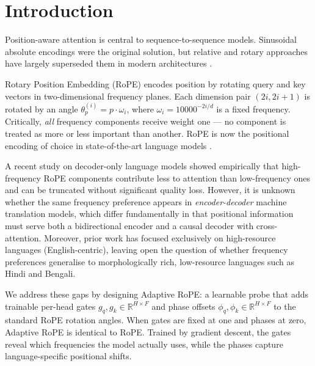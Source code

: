 \documentclass[conference]{IEEEtran}
\begin{document}
\section{Introduction}

Position-aware attention is central to sequence-to-sequence models. Sinusoidal
absolute encodings \cite{vaswani2017attention} were the original solution, but
relative and rotary approaches have largely superseded them in modern
architectures \cite{su2021roformer,press2021train,raffel2020exploring}.

Rotary Position Embedding (RoPE) \cite{su2021roformer} encodes position by
rotating query and key vectors in two-dimensional frequency planes. Each
dimension pair $(2i, 2i{+}1)$ is rotated by an angle $\theta_p^{(i)} = p \cdot
\omega_i$, where $\omega_i = 10000^{-2i/d}$ is a fixed frequency. Critically,
\emph{all} frequency components receive weight one --- no component is treated as
more or less important than another. RoPE is now the positional encoding of
choice in state-of-the-art language models \cite{touvron2023llama,jiang2023mistral}.

A recent study on decoder-only language models \cite{men2024roundandround}
showed empirically that high-frequency RoPE components contribute less to
attention than low-frequency ones and can be truncated without significant
quality loss. However, it is unknown whether the same frequency preference
appears in \emph{encoder-decoder} machine translation models, which differ
fundamentally in that positional information must serve both a bidirectional
encoder and a causal decoder with cross-attention. Moreover, prior work has
focused exclusively on high-resource languages (English-centric), leaving open
the question of whether frequency preferences generalise to morphologically
rich, low-resource languages such as Hindi and Bengali.

We address these gaps by designing Adaptive RoPE: a learnable probe that adds
trainable per-head gates $g_q, g_k \in \mathbb{R}^{H \times F}$ and phase
offsets $\phi_q, \phi_k \in \mathbb{R}^{H \times F}$ to the standard RoPE
rotation angles. When gates are fixed at one and phases at zero, Adaptive RoPE
is identical to RoPE. Trained by gradient descent, the gates reveal which
frequencies the model actually uses, while the phases capture language-specific
positional shifts.
\end{document}
